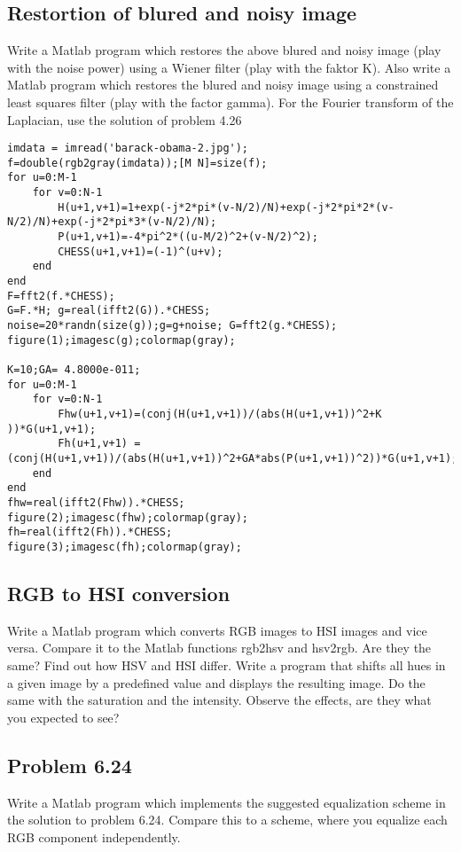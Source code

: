 \subsection{Restortion of blured and noisy image}
Write a Matlab program which restores the above blured and noisy image (play
with the noise power) using a Wiener filter (play with the faktor K). Also write a Matlab program which restores the blured and noisy image using a constrained least squares filter (play with the factor gamma). For the Fourier transform of the Laplacian, use the solution of problem 4.26
\begin{lstlisting}
imdata = imread('barack-obama-2.jpg');
f=double(rgb2gray(imdata));[M N]=size(f);
for u=0:M-1
    for v=0:N-1
        H(u+1,v+1)=1+exp(-j*2*pi*(v-N/2)/N)+exp(-j*2*pi*2*(v-N/2)/N)+exp(-j*2*pi*3*(v-N/2)/N);
        P(u+1,v+1)=-4*pi^2*((u-M/2)^2+(v-N/2)^2);
        CHESS(u+1,v+1)=(-1)^(u+v);
    end
end
F=fft2(f.*CHESS);
G=F.*H; g=real(ifft2(G)).*CHESS;
noise=20*randn(size(g));g=g+noise; G=fft2(g.*CHESS);
figure(1);imagesc(g);colormap(gray);

K=10;GA= 4.8000e-011;
for u=0:M-1
    for v=0:N-1
        Fhw(u+1,v+1)=(conj(H(u+1,v+1))/(abs(H(u+1,v+1))^2+K                   ))*G(u+1,v+1);
        Fh(u+1,v+1) =(conj(H(u+1,v+1))/(abs(H(u+1,v+1))^2+GA*abs(P(u+1,v+1))^2))*G(u+1,v+1);
    end
end
fhw=real(ifft2(Fhw)).*CHESS;
figure(2);imagesc(fhw);colormap(gray);
fh=real(ifft2(Fh)).*CHESS;
figure(3);imagesc(fh);colormap(gray);
\end{lstlisting}
\subsection{RGB to HSI conversion}
Write a Matlab program which converts RGB images to HSI images and vice versa.
Compare it to the Matlab functions rgb2hsv and hsv2rgb. Are they the same?  Find out how HSV and HSI differ. Write a program that shifts all hues in a given image by a predefined value and displays the resulting image. Do the same with the saturation and the intensity. Observe the effects, are they what you expected to see?
\subsection{Problem 6.24}
Write a Matlab program which implements the suggested equalization scheme in the
solution to problem 6.24.  Compare this to a scheme, where you equalize each RGB component independently.
